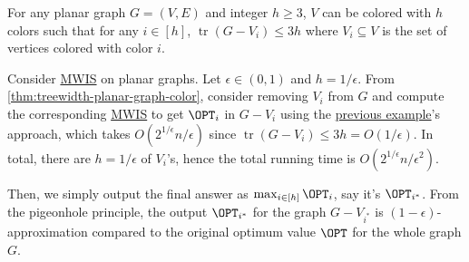 \begin{theorem}\label{thm:treewidth-planar-graph-color}
	For any planar graph \(G = (V, E)\) and integer \(h \geq 3\), \(V\) can be colored with \(h\) colors such that for any \(i \in [h]\), \(\operatorname{tr}(G - V_i) \leq 3h\) where \(V_i \subseteq V\) is the set of vertices colored with color \(i\).
\end{theorem}

\begin{eg}
	Consider \hyperref[prb:MWIS]{MWIS} on planar graphs. Let \(\epsilon \in (0, 1)\) and \(h = 1 / \epsilon \). From \autoref{thm:treewidth-planar-graph-color}, consider removing \(V_i\) from \(G\) and compute the corresponding \hyperref[prb:MWIS]{MWIS} to get \(\OPT_i\) in \(G - V_i\) using the \hyperref[eg:MWIS-tree-decomposition]{previous example}'s approach, which takes \(O(2^{1 / \epsilon } n / \epsilon )\) since \(\operatorname{tr}(G-V_i) \leq 3h = O(1 / \epsilon )\). In total, there are \(h = 1 / \epsilon \) of \(V_i\)'s, hence the total running time is \(O(2^{1 / \epsilon } n / \epsilon ^2)\).

	Then, we simply output the final answer as \(\max _{i\in [h]} \OPT_i\), say it's \(\OPT_{i^{\ast} }\). From the pigeonhole principle, the output \(\OPT_{i^{\ast} }\) for the graph \(G- V_{i^{\ast} }\) is \((1-\epsilon)\)-approximation compared to the original optimum value \(\OPT\) for the whole graph \(G\).
\end{eg}